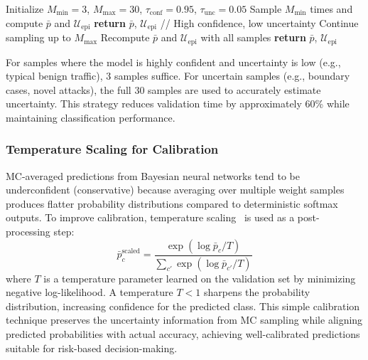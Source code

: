 \documentclass[lettersize,journal]{IEEEtran}
\begin{document}
\begin{algorithm}[H]
\caption{Adaptive Monte Carlo Sampling}
\label{alg:adaptive_mc}
\begin{algorithmic}[1]
\STATE Initialize $M_{\min}=3$, $M_{\max}=30$, $\tau_{\text{conf}}=0.95$, $\tau_{\text{unc}}=0.05$
\STATE Sample $M_{\min}$ times and compute $\bar{p}$ and $\mathcal{U}_{\text{epi}}$
    \STATE \textbf{return} $\bar{p}$, $\mathcal{U}_{\text{epi}}$ \quad // High confidence, low uncertainty
\ELSE
    \STATE Continue sampling up to $M_{\max}$
    \STATE Recompute $\bar{p}$ and $\mathcal{U}_{\text{epi}}$ with all samples
    \STATE \textbf{return} $\bar{p}$, $\mathcal{U}_{\text{epi}}$
\ENDIF
\end{algorithmic}
\end{algorithm}

For samples where the model is highly confident and uncertainty is low (e.g., typical benign traffic), 3 samples suffice. For uncertain samples (e.g., boundary cases, novel attacks), the full 30 samples are used to accurately estimate uncertainty. This strategy reduces validation time by approximately 60\% while maintaining classification performance.

\subsubsection{Temperature Scaling for Calibration}

MC-averaged predictions from Bayesian neural networks tend to be underconfident (conservative) because averaging over multiple weight samples produces flatter probability distributions compared to deterministic softmax outputs. To improve calibration, temperature scaling~\cite{Guo_Calibration_2017} is used as a post-processing step:
\begin{equation}
\bar{p}_c^{\text{scaled}} = \frac{\exp(\log \bar{p}_c / T)}{\sum_{c'} \exp(\log \bar{p}_{c'} / T)}
\end{equation}
where $T$ is a temperature parameter learned on the validation set by minimizing negative log-likelihood. A temperature $T < 1$ sharpens the probability distribution, increasing confidence for the predicted class. This simple calibration technique preserves the uncertainty information from MC sampling while aligning predicted probabilities with actual accuracy, achieving well-calibrated predictions suitable for risk-based decision-making.
\end{document}
